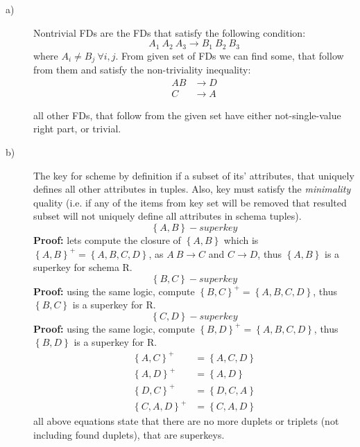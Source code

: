 \documentclass[a4paper]{article}
\newcommand{\set}[1]{\left\{#1\right\}}
\newcommand{\ra}{\rightarrow}
\newenvironment{answer}%
{\begin{framed}%
\vspace{0.5cm}}%
{\end{framed}\vspace{0.5cm}}
\begin{document}
	\begin{answer}
		\begin{description}
			\item[a)] Nontrivial FDs are the FDs that satisfy the following condition:
			\begin{equation*}
				A_1\ A_2\ A_3 \ra B_1\ B_2\ B_3
			\end{equation*}
			where $A_i \neq B_j\ \forall i, j$. From given set of FDs we can find some, that follow from them and satisfy the non-triviality inequality:
			\begin{align*}
				AB &\ra D \\
				C &\ra A	
			\end{align*}

			all other FDs, that follow from the given set have either not-single-value right part, or trivial.
			\item[b)] The key for scheme by definition if a subset of its' attributes, that uniquely defines all other attributes in tuples. Also, key must satisfy the \emph{minimality} quality (i.e. if any of the items from key set will be removed that resulted subset will not uniquely define all attributes in schema tuples). 
			\begin{equation*}
				\set{A,B} - superkey		
			\end{equation*}
			\textbf{Proof:} lets compute the closure of $\set{A,B}$ which is $\set{A,B}^+ = \set{A,B,C,D}$, as $A\ B \ra C$ and $C \ra D$, thus $\set{A,B}$ is a superkey for schema R.
			\begin{equation*}
				\set{B,C} - superkey		
			\end{equation*}	
			\textbf{Proof:} using the same logic, compute $\set{B,C}^+ = \set{A,B,C,D}$, thus $\set{B,C}$ is a superkey for R.
			\begin{equation*}
				\set{C,D} -superkey
			\end{equation*}	
			\textbf{Proof:} using the same logic, compute $\set{B,D}^+ = \set{A,B,C,D}$, thus $\set{B,D}$ is a superkey for R.
			\begin{align*}
				\set{A,C}^+ &= \set{A,C,D} \\
				\set{A,D}^+ &= \set{A,D} \\
				\set{D,C}^+ &= \set{D,C,A} \\
				\set{C,A,D}^+ &= \set{C,A,D}
			\end{align*}
			all above equations state that there are no more duplets or triplets (not including found duplets), that are superkeys.


\end{description}
\end{answer}
\end{document}
